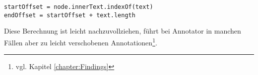     \begin{lstlisting}
startOffset = node.innerText.indexOf(text)
endOffset = startOffset + text.length
    \end{lstlisting}
    
    Diese Berechnung ist leicht nachzuvollziehen,
    führt bei Annotator in manchen Fällen aber zu leicht verschobenen
    Annotationen\footnote{vgl. Kapitel \ref{chapter:Findings}}.

